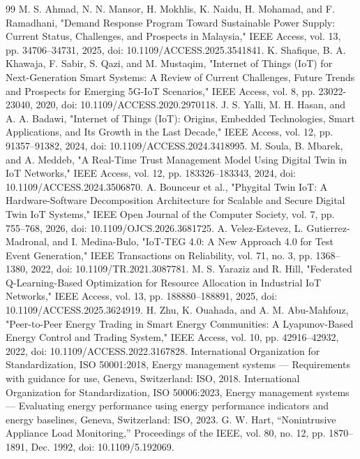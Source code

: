 \documentclass[technologies,article,submit,pdftex,moreauthors]{Definitions/mdpi}
\begin{document}
\begin{thebibliography}{99}
 M. S. Ahmad, N. N. Mansor, H. Mokhlis, K. Naidu, H. Mohamad, and F. Ramadhani, "Demand Response Program Toward Sustainable Power Supply: Current Status, Challenges, and Prospects in Malaysia," IEEE Access, vol. 13, pp. 34706--34731, 2025, doi: 10.1109/ACCESS.2025.3541841.
 K. Shafique, B. A. Khawaja, F. Sabir, S. Qazi, and M. Mustaqim, "Internet of Things (IoT) for Next-Generation Smart Systems: A Review of Current Challenges, Future Trends and Prospects for Emerging 5G-IoT Scenarios," IEEE Access, vol. 8, pp. 23022-23040, 2020, doi: 10.1109/ACCESS.2020.2970118.
 J. S. Yalli, M. H. Hasan, and A. A. Badawi, "Internet of Things (IoT): Origins, Embedded Technologies, Smart Applications, and Its Growth in the Last Decade," IEEE Access, vol. 12, pp. 91357--91382, 2024, doi: 10.1109/ACCESS.2024.3418995.
 M. Soula, B. Mbarek, and A. Meddeb, "A Real-Time Trust Management Model Using Digital Twin in IoT Networks," IEEE Access, vol. 12, pp. 183326--183343, 2024, doi: 10.1109/ACCESS.2024.3506870.
 A. Bounceur et al., "Phygital Twin IoT: A Hardware-Software Decomposition Architecture for Scalable and Secure Digital Twin IoT Systems," IEEE Open Journal of the Computer Society, vol. 7, pp. 755--768, 2026, doi: 10.1109/OJCS.2026.3681725.
 A. Velez-Estevez, L. Gutierrez-Madronal, and I. Medina-Bulo, "IoT-TEG 4.0: A New Approach 4.0 for Test Event Generation," IEEE Transactions on Reliability, vol. 71, no. 3, pp. 1368--1380, 2022, doi: 10.1109/TR.2021.3087781.
 M. S. Yaraziz and R. Hill, "Federated Q-Learning-Based Optimization for Resource Allocation in Industrial IoT Networks," IEEE Access, vol. 13, pp. 188880--188891, 2025, doi: 10.1109/ACCESS.2025.3624919.
 H. Zhu, K. Ouahada, and A. M. Abu-Mahfouz, "Peer-to-Peer Energy Trading in Smart Energy Communities: A Lyapunov-Based Energy Control and Trading System," IEEE Access, vol. 10, pp. 42916--42932, 2022, doi: 10.1109/ACCESS.2022.3167828.
 International Organization for Standardization, ISO 50001:2018, Energy management systems --- Requirements with guidance for use, Geneva, Switzerland: ISO, 2018.
 International Organization for Standardization, ISO 50006:2023, Energy management systems --- Evaluating energy performance using energy performance indicators and energy baselines, Geneva, Switzerland: ISO, 2023.
 G. W. Hart, ``Nonintrusive Appliance Load Monitoring,'' Proceedings of the IEEE, vol. 80, no. 12, pp. 1870--1891, Dec. 1992, doi: 10.1109/5.192069.

\end{thebibliography}
\end{document}
